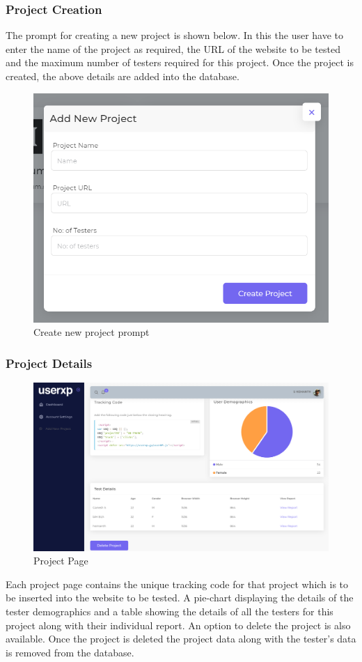 \documentclass[12pt,a4paper,final]{extreport}
\begin{document}
\subsubsection{Project Creation}
The prompt for creating a new project is shown below. In this the user have to enter the name of the project as required, the URL of the website to be tested and the maximum number of testers required for this project. Once the project is created, the above details are added into the database.
\begin{figure}[H]
    \centering
    \includegraphics[scale=.8]{create-project.png}
    \caption{Create new project prompt}
\end{figure}
\subsubsection{Project Details}
\begin{figure}[H]
    \centering
    \includegraphics[width=\linewidth]{project-page.png}
    \caption{Project Page}
\end{figure}
Each project page contains the unique tracking code for that project which is to be inserted into the website to be tested.
A pie-chart displaying the details of the tester demographics and a table showing the details of all the testers for this project along with their individual report.
An option to delete the project is also available. Once the project is deleted the project data along with the tester’s data is removed from the database.
\end{document}
